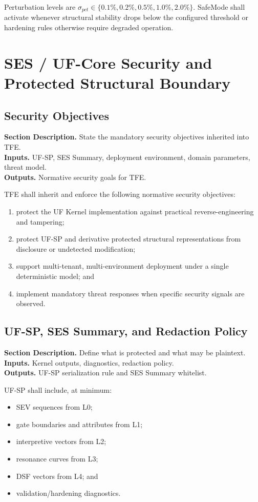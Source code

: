 \documentclass[11pt]{report}
\newcommand{\meta}[3]{\textbf{Section Description.} #1\\
\textbf{Inputs.} #2\\
\textbf{Outputs.} #3\par}
\begin{document}
Perturbation levels are $\sigma_{pct}\in\{0.1\%,0.2\%,0.5\%,1.0\%,2.0\%\}$. SafeMode shall activate whenever structural stability drops below the configured threshold or hardening rules otherwise require degraded operation.

\chapter{SES / UF-Core Security and Protected Structural Boundary}
\section{Security Objectives}
\meta{State the mandatory security objectives inherited into TFE.}{UF-SP, SES Summary, deployment environment, domain parameters, threat model.}{Normative security goals for TFE.}

TFE shall inherit and enforce the following normative security objectives:
\begin{enumerate}[leftmargin=1.2cm]
    \item protect the UF Kernel implementation against practical reverse-engineering and tampering;
    \item protect UF-SP and derivative protected structural representations from disclosure or undetected modification;
    \item support multi-tenant, multi-environment deployment under a single deterministic model; and
    \item implement mandatory threat responses when specific security signals are observed.
\end{enumerate}

\section{UF-SP, SES Summary, and Redaction Policy}
\meta{Define what is protected and what may be plaintext.}{Kernel outputs, diagnostics, redaction policy.}{UF-SP serialization rule and SES Summary whitelist.}

UF-SP shall include, at minimum:
\begin{itemize}
    \item SEV sequences from L0;
    \item gate boundaries and attributes from L1;
    \item interpretive vectors from L2;
    \item resonance curves from L3;
    \item DSF vectors from L4; and
    \item validation/hardening diagnostics.
\end{itemize}
\end{document}
